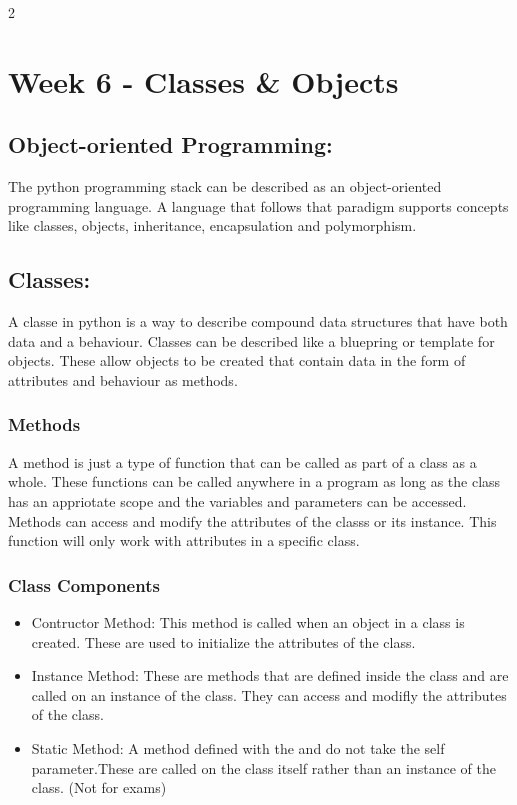 \documentclass[a4paper]{report}
\begin{document}
\begin{flushleft}
\begin{multicols}{2}
	\section*{Week 6 - Classes \& Objects}
	\subsection*{Object-oriented Programming:}
	The python programming stack can be described as an object-oriented programming language. A language that follows that paradigm supports concepts like classes, objects, inheritance, encapsulation and polymorphism. 

	\subsection*{Classes:}
	A classe in python is a way to describe compound data structures that have both data and a behaviour. Classes can be described like a bluepring or template for objects. These allow objects to be created that contain data in the form of attributes and behaviour as methods.
	\subsubsection*{Methods}
	A method is just a type of function that can be called as part of a class as a whole. These functions can be called anywhere in a program as long as the class has an appriotate scope and the variables and parameters can be accessed. Methods can access and modify the attributes of the classs or its instance. This function will only work with attributes in a specific class.
	\subsubsection*{Class Components}
	\begin{itemize}
		\item Contructor Method: This method is called when an object in a class is created. These are used to initialize the attributes of the class.
		\item Instance Method: These are methods that are defined inside the class and are called on an instance of the class. They can access and modifly the attributes of the class.
		\item Static Method: A method defined with the \@staticmethod and do not take the self parameter.These are called on the class itself rather than an instance of the class. (Not for exams)
	\end{itemize}

\end{multicols}
\end{flushleft}
\end{document}
